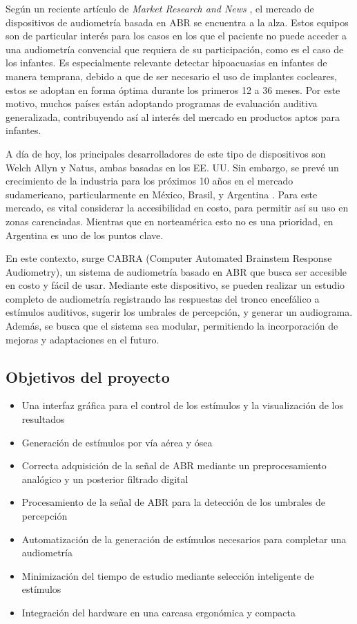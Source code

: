 Según un reciente artículo de \textit{Market Research and News} \cite{news_abr_nodate}, el mercado de dispositivos de audiometría basada en ABR se encuentra a la alza.
Estos equipos son de particular interés para los casos en los que el paciente no puede acceder a una audiometría convencial que requiera de su participación, como es el caso de los infantes.
Es especialmente relevante detectar hipoacuasias en infantes de manera temprana, debido a que de ser necesario el uso de implantes cocleares, estos se adoptan en forma óptima durante los primeros 12 a 36 meses.
Por este motivo, muchos países están adoptando programas de evaluación auditiva generalizada, contribuyendo así al interés del mercado en productos aptos para infantes.

A día de hoy, los principales desarrolladores de este tipo de dispositivos son Welch Allyn y Natus, ambas basadas en los EE. UU. Sin embargo, se prevé un crecimiento de la industria para los próximos 10 años en el mercado sudamericano, particularmente en México, Brasil, y Argentina \cite{news_abr_nodate}.
Para este mercado, es vital considerar la accesibilidad en costo, para permitir así su uso en zonas carenciadas.
Mientras que en norteamérica esto no es una prioridad, en Argentina es uno de los puntos clave.

En este contexto, surge CABRA (Computer Automated Brainstem Response Audiometry), un sistema de audiometría basado en ABR que busca ser accesible en costo y fácil de usar.
Mediante este dispositivo, se pueden realizar un estudio completo de audiometría registrando las respuestas del tronco encefálico a estímulos auditivos, sugerir los umbrales de percepción, y generar un audiograma.
Además, se busca que el sistema sea modular, permitiendo la incorporación de mejoras y adaptaciones en el futuro.

\subsection{Objetivos del proyecto} \label{objetivos}
\begin{itemize}
    \item Una interfaz gráfica para el control de los estímulos y la visualización de los resultados
    \item Generación de estímulos por vía aérea y ósea
    \item Correcta adquisición de la señal de ABR mediante un preprocesamiento analógico y un posterior filtrado digital
    \item Procesamiento de la señal de ABR para la detección de los umbrales de percepción
    \item Automatización de la generación de estímulos necesarios para completar una audiometría
    \item Minimización del tiempo de estudio mediante selección inteligente de estímulos
    \item Integración del hardware en una carcasa ergonómica y compacta
\end{itemize}
